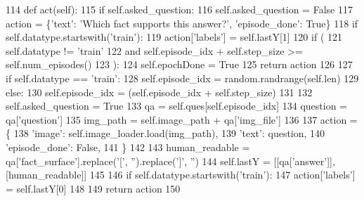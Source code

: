 \begin{DoxyCode}
114     \textcolor{keyword}{def }act(self):
115         \textcolor{keywordflow}{if} self.asked\_question:
116             self.asked\_question = \textcolor{keyword}{False}
117             action = \{\textcolor{stringliteral}{'text'}: \textcolor{stringliteral}{'Which fact supports this answer?'}, \textcolor{stringliteral}{'episode\_done'}: \textcolor{keyword}{True}\}
118             \textcolor{keywordflow}{if} self.datatype.startswith(\textcolor{stringliteral}{'train'}):
119                 action[\textcolor{stringliteral}{'labels'}] = self.lastY[1]
120             \textcolor{keywordflow}{if} (
121                 self.datatype != \textcolor{stringliteral}{'train'}
122                 \textcolor{keywordflow}{and} self.episode\_idx + self.step\_size >= self.num\_episodes()
123             ):
124                 self.epochDone = \textcolor{keyword}{True}
125             \textcolor{keywordflow}{return} action
126 
127         \textcolor{keywordflow}{if} self.datatype == \textcolor{stringliteral}{'train'}:
128             self.episode\_idx = random.randrange(self.len)
129         \textcolor{keywordflow}{else}:
130             self.episode\_idx = (self.episode\_idx + self.step\_size) %
131 
132         self.asked\_question = \textcolor{keyword}{True}
133         qa = self.ques[self.episode\_idx]
134         question = qa[\textcolor{stringliteral}{'question'}]
135         img\_path = self.image\_path + qa[\textcolor{stringliteral}{'img\_file'}]
136 
137         action = \{
138             \textcolor{stringliteral}{'image'}: self.image\_loader.load(img\_path),
139             \textcolor{stringliteral}{'text'}: question,
140             \textcolor{stringliteral}{'episode\_done'}: \textcolor{keyword}{False},
141         \}
142 
143         human\_readable = qa[\textcolor{stringliteral}{'fact\_surface'}].replace(\textcolor{stringliteral}{'['}, \textcolor{stringliteral}{''}).replace(\textcolor{stringliteral}{']'}, \textcolor{stringliteral}{''})
144         self.lastY = [[qa[\textcolor{stringliteral}{'answer'}]], [human\_readable]]
145 
146         \textcolor{keywordflow}{if} self.datatype.startswith(\textcolor{stringliteral}{'train'}):
147             action[\textcolor{stringliteral}{'labels'}] = self.lastY[0]
148 
149         \textcolor{keywordflow}{return} action
150 
\end{DoxyCode}
\mbox{\label{classparlai_1_1tasks_1_1fvqa_1_1agents_1_1SplitTeacher_afb8c188440f9aa2721a308969380f2bc}} 
